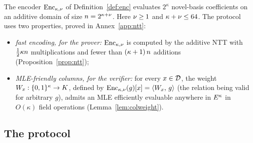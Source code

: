 The encoder $\mathrm{Enc}_{\kappa,\nu}$ of Definition~\ref{def:enc} evaluates $2^\kappa$ novel-basis coefficients on an additive domain of size $n=2^{\kappa+\nu}$. Here $\nu\ge1$ and $\kappa+\nu\le64$. The protocol uses two properties, proved in Annex~\ref{app:ntt}:
\begin{itemize}[itemsep=2pt]
\item \emph{fast encoding, for the prover:} $\mathrm{Enc}_{\kappa,\nu}$ is computed by the additive NTT with $\tfrac12 \kappa n$ multiplications and fewer than $(\kappa + 1)\, n$ additions (Proposition~\ref{prop:ntt});
\item \emph{MLE-friendly columns, for the verifier:} for every $x \in \mathcal{D}$, the weight $W_x : \{0,1\}^{\kappa} \to K$, defined by $\mathrm{Enc}_{\kappa,\nu}(g)[x] = \langle W_x,\, g \rangle$ (the relation being valid for arbitrary $g$), admits an MLE efficiently evaluable anywhere in $E^{\kappa}$ in $O(\kappa)$ field operations (Lemma~\ref{lem:colweight}).
\end{itemize}

\subsection{The protocol}\label{sec:protocol}

